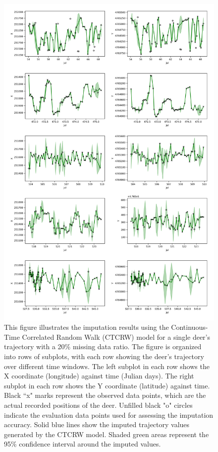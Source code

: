 \documentclass[11pt]{article}
\begin{document}
\begin{figure}[h]
  \centering
  \includegraphics[width=\textwidth]{../figure/20_5094_crawl} %
  \caption{This figure illustrates the imputation results using the Continuous-Time Correlated Random Walk (CTCRW) model for a single deer's trajectory with a 20\% missing data ratio. The figure is organized into rows of subplots, with each row showing the deer's trajectory over different time windows. The left subplot in each row shows the X coordinate (longitude) against time (Julian days). The right subplot in each row shows the Y coordinate (latitude) against time. Black ``x" marks represent the observed data points, which are the actual recorded positions of the deer. Unfilled black "o" circles indicate the evaluation data points used for assessing the imputation accuracy. Solid blue lines show the imputed trajectory values generated by the CTCRW model. Shaded green areas represent the 95\% confidence interval around the imputed values.
}
  \label{fig: ctcrw_20} %
\end{figure}
\end{document}
